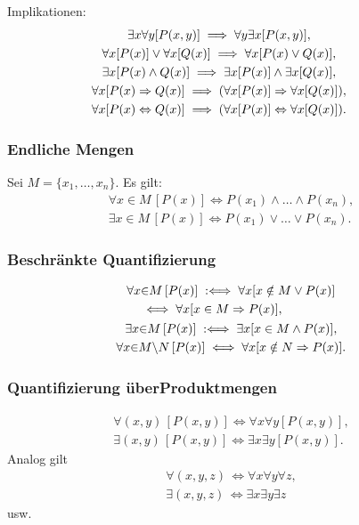 Implikationen:
\begin{gather}
\hspace{-2em}\exists x\forall y[P(x,y)]\implies \forall y\exists x[P(x,y)],\\
\hspace{-2em}\forall x[P(x)]\lor\forall x[Q(x)]\implies\forall x[P(x)\lor Q(x)],\\
\hspace{-2em}\exists x[P(x)\land Q(x)]\implies
  \exists x[P(x)]\land \exists x[Q(x)],\\
\hspace{-2em}\forall x[P(x)\Rightarrow Q(x)]\implies
  (\forall x[P(x)]\Rightarrow\forall x[Q(x)]),\\
\hspace{-2em}\forall x[P(x)\Leftrightarrow Q(x)]\implies
  (\forall x[P(x)]\Leftrightarrow\forall x[Q(x)]).
\end{gather}

\newpage
\subsubsection{Endliche Mengen}
Sei $M=\{x_1,\ldots,x_n\}$. Es gilt:
\begin{gather}
\forall x{\in}M\,[P(x)]\iff P(x_1)\land\ldots\land P(x_n),\\
\exists x{\in}M\,[P(x)]\iff P(x_1)\lor\ldots\lor P(x_n).
\end{gather}

\subsubsection{Beschränkte Quantifizierung}
\begin{gather}
\begin{split}
& \forall x{\in}M\,[P(x)]\;:\Longleftrightarrow\;\forall x[x\notin M\lor P(x)]\\
& \quad\iff\forall x[x\in M\Rightarrow P(x)],
\end{split}\\
\exists x{\in}M\,[P(x)]\;:\Longleftrightarrow\;\exists x[x\in M\land P(x)],\\
\forall x{\in}M{\setminus}N\,[P(x)]\iff \forall x[x\notin N\Rightarrow P(x)].
\end{gather}

\subsubsection[Quantifizierung über Produktmengen]%
{Quantifizierung über\newline Produktmengen}
\begin{gather}
\forall(x,y)\,[P(x,y)]\iff \forall x\forall y[P(x,y)],\\
\exists(x,y)\,[P(x,y)]\iff \exists x\exists y[P(x,y)].
\end{gather}
Analog gilt
\begin{gather}
\forall(x,y,z)\,\iff \forall x\forall y\forall z,\\
\exists(x,y,z)\,\iff \exists x\exists y\exists z
\end{gather}
usw.

